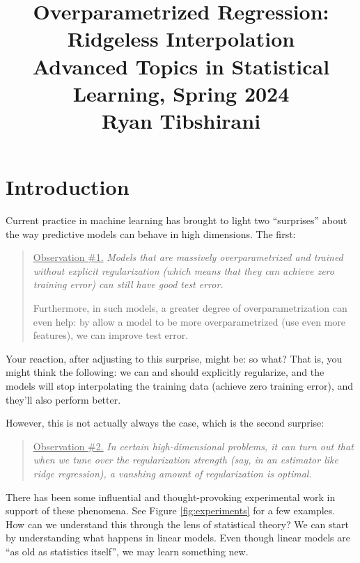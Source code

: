 \documentclass{article}
\title{Overparametrized Regression: Ridgeless Interpolation \\ \smallskip
\large Advanced Topics in Statistical Learning, Spring 2024 \\ \smallskip
Ryan Tibshirani}
\date{}
\begin{document}
\maketitle
\RaggedRight
\vspace{-50pt}

\section{Introduction}

Current practice in machine learning has brought to light two ``surprises''
about the way predictive models can behave in high dimensions. The first:  

\begin{quote} \underline{Observation \#1.} \it 
Models that are massively overparametrized and trained without explicit
regularization (which means that they can achieve zero training error) can still
have good test error.  

Furthermore, in such models, a greater degree of overparametrization can even
help: by allow a model to be more overparametrized (use even more features), we
can improve test error.   
\end{quote}

Your reaction, after adjusting to this surprise, might be: so what? That is, you
might think the following: we can and should explicitly regularize, and the
models will stop interpolating the training data (achieve zero training error),
and they'll also perform better.

However, this is not actually always the case, which is the second surprise: 

\begin{quote} \underline{Observation \#2.} \it  
In certain high-dimensional problems, it can turn out that when we tune over the
regularization strength (say, in an estimator like ridge regression), a vanshing
amount of regularization is optimal.    
\end{quote}

There has been some influential and thought-provoking experimental work in
support of these phenomena. See Figure \ref{fig:experiments} for a few
examples. How can we understand this through the lens of statistical theory?
We can start by understanding what happens in linear models. Even though linear
models are ``as old as statistics itself'', we may learn something new.    
\end{document}

